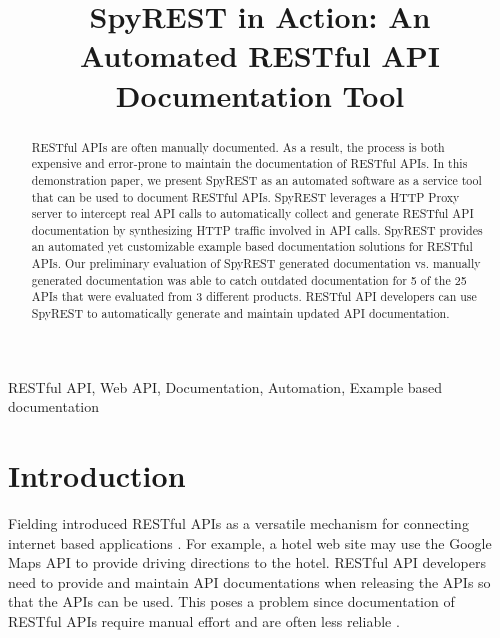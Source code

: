 \documentclass[conference]{IEEEtran}
\begin{document}
\title{SpyREST in Action: An Automated RESTful API Documentation Tool}

\author{
}
\maketitle


\begin{abstract}
RESTful APIs are often manually documented. As a result, the process is both expensive and error-prone to maintain the documentation of RESTful APIs. In this demonstration paper, we present SpyREST as an automated software as a service tool that can be used to document RESTful APIs. SpyREST leverages a HTTP Proxy server to intercept real API calls to automatically collect and generate RESTful API documentation by synthesizing HTTP traffic involved in API calls. SpyREST provides an automated yet customizable example based documentation solutions for RESTful APIs. Our preliminary evaluation of SpyREST generated documentation vs. manually generated documentation was able to catch outdated documentation for 5 of the 25 APIs that were evaluated from 3 different products. RESTful API developers can use SpyREST to automatically generate and maintain updated API documentation.

\end{abstract}

\begin{IEEEkeywords}
RESTful API, Web API, Documentation, Automation, Example based documentation
\end{IEEEkeywords}

\IEEEpeerreviewmaketitle

\section{Introduction}
Fielding introduced RESTful APIs as a versatile mechanism for connecting internet based applications \cite{Fielding_rest}. For example, a hotel web site may use the Google Maps API to provide driving directions to the hotel. RESTful API developers need to provide and maintain API documentations when releasing the APIs so that the APIs can be used. This poses a problem since documentation of RESTful APIs require manual effort and are often less reliable \cite{Espinha_web}.
\end{document}
